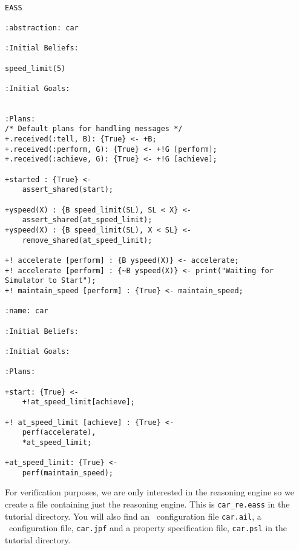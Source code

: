\begin{ourexample}
\label{code:EASSverifexample} \quad \\
\begin{lstlisting}[basicstyle=\sffamily,style=easslisting,language=Gwendolen]
EASS

:abstraction: car

:Initial Beliefs:

speed_limit(5)
													
:Initial Goals:
		

:Plans: 
/* Default plans for handling messages */
+.received(:tell, B): {True} <- +B;   
+.received(:perform, G): {True} <- +!G [perform];
+.received(:achieve, G): {True} <- +!G [achieve];

+started : {True} <-
	assert_shared(start);

+yspeed(X) : {B speed_limit(SL), SL < X} <-
	assert_shared(at_speed_limit);
+yspeed(X) : {B speed_limit(SL), X < SL} <-
	remove_shared(at_speed_limit);
	
+! accelerate [perform] : {B yspeed(X)} <- accelerate;
+! accelerate [perform] : {~B yspeed(X)} <- print("Waiting for Simulator to Start");
+! maintain_speed [perform] : {True} <- maintain_speed;

:name: car
			
:Initial Beliefs:
													
:Initial Goals:
		
:Plans: 

+start: {True} <-
	+!at_speed_limit[achieve];

+! at_speed_limit [achieve] : {True} <-
	perf(accelerate),
	*at_speed_limit;

+at_speed_limit: {True} <-
	perf(maintain_speed);
\end{lstlisting} 
\end{ourexample}

For verification purposes, we are only interested in the reasoning engine so we create a file containing just the reasoning engine.  This is \texttt{car\_re.eass} in the tutorial directory.  You will also find an \ail\ configuration file \texttt{car.ail}, a \jpf\ configuration file, \texttt{car.jpf} and a property specification file, \texttt{car.psl} in the tutorial directory.

